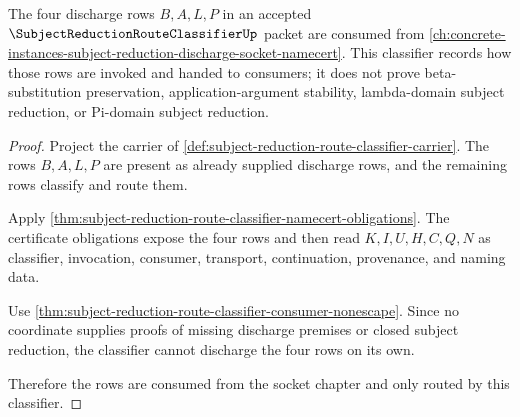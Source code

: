 \begin{theorem}
\label{thm:subject-reduction-route-classifier-socket-scope}
The four discharge rows $B,A,L,P$ in an accepted $\SubjectReductionRouteClassifierUp$ packet are consumed from \autoref{ch:concrete-instances-subject-reduction-discharge-socket-namecert}. This classifier records how those rows are invoked and handed to consumers; it does not prove beta-substitution preservation, application-argument stability, lambda-domain subject reduction, or Pi-domain subject reduction.
\end{theorem}
\begin{proof}
Project the carrier of \autoref{def:subject-reduction-route-classifier-carrier}. The rows $B,A,L,P$ are present as already supplied discharge rows, and the remaining rows classify and route them.

Apply \autoref{thm:subject-reduction-route-classifier-namecert-obligations}. The certificate obligations expose the four rows and then read $K,I,U,H,C,Q,N$ as classifier, invocation, consumer, transport, continuation, provenance, and naming data.

Use \autoref{thm:subject-reduction-route-classifier-consumer-nonescape}. Since no coordinate supplies proofs of missing discharge premises or closed subject reduction, the classifier cannot discharge the four rows on its own.

Therefore the rows are consumed from the socket chapter and only routed by this classifier.
\end{proof}

